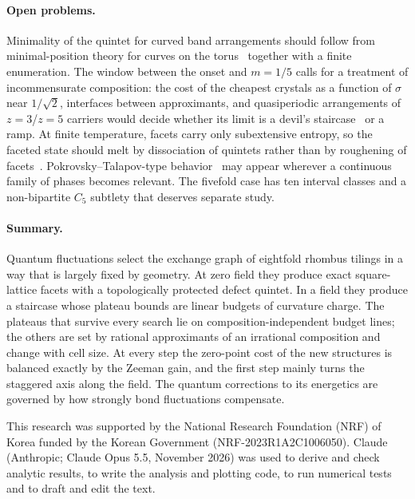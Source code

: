 \documentclass[aps,prb,twocolumn,superscriptaddress,floatfix]{revtex4-2}
\begin{document}
\paragraph*{Open problems.} Minimality of the quintet for curved band arrangements should follow from minimal-position theory for curves on the torus~\cite{HassScott1985} together with a finite enumeration. The window between the onset and $m=1/5$ calls for a treatment of incommensurate composition: the cost of the cheapest crystals as a function of $\sigma$ near $1/\sqrt2$, interfaces between approximants, and quasiperiodic arrangements of $z=3$/$z=5$ carriers would decide whether its limit is a devil's staircase~\cite{BakBruinsma1982} or a ramp. At finite temperature, facets carry only subextensive entropy, so the faceted state should melt by dissociation of quintets rather than by roughening of facets~\cite{Henley1991}. Pokrovsky--Talapov-type behavior~\cite{Pokrovsky1979} may appear wherever a continuous family of phases becomes relevant. The fivefold case has ten interval classes and a non-bipartite $C_5$ subtlety that deserves separate study.

\paragraph*{Summary.} Quantum fluctuations select the exchange graph of eightfold rhombus tilings in a way that is largely fixed by geometry. At zero field they produce exact square-lattice facets with a topologically protected defect quintet. In a field they produce a staircase whose plateau bounds are linear budgets of curvature charge. The plateaus that survive every search lie on composition-independent budget lines; the others are set by rational approximants of an irrational composition and change with cell size. At every step the zero-point cost of the new structures is balanced exactly by the Zeeman gain, and the first step mainly turns the staggered axis along the field. The quantum corrections to its energetics are governed by how strongly bond fluctuations compensate.

\begin{acknowledgments}
This research was supported by the National Research Foundation (NRF) of Korea funded by the Korean Government (NRF-2023R1A2C1006050). Claude (Anthropic; Claude Opus 5.5, November 2026) was used to derive and check analytic results, to write the analysis and plotting code, to run numerical tests and to draft and edit the text.
\end{acknowledgments}
\end{document}
